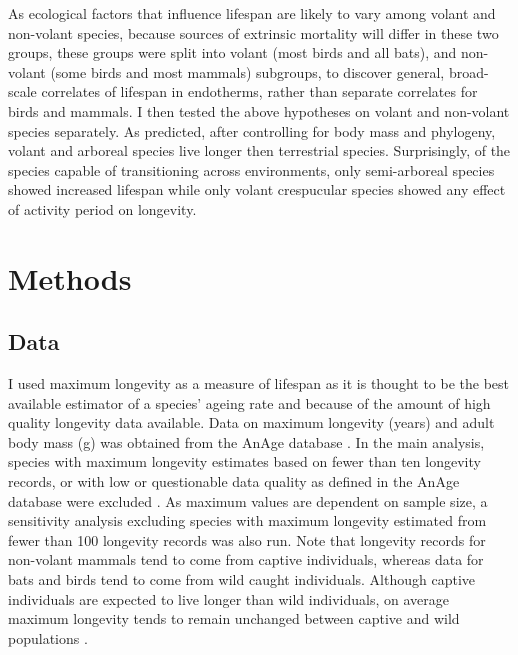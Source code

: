 As ecological factors that influence lifespan are likely to vary among volant and non-volant species, because sources of extrinsic mortality will differ in these two groups, these groups were split into volant (most birds and all bats), and non-volant (some birds and most mammals) subgroups, to discover general, broad-scale correlates of lifespan in endotherms, rather than separate correlates for birds and mammals. I then tested the above hypotheses on volant and non-volant species separately. As predicted, after controlling for body mass and phylogeny, volant and arboreal species live longer then terrestrial species. Surprisingly, of the species capable of transitioning across environments, only semi-arboreal species showed increased lifespan while only volant crespucular species showed any effect of activity period on longevity.

\section{Methods}
\subsection{Data}

I used maximum longevity as a measure of lifespan as it is thought to be the best available estimator of a species' ageing rate \citep{de2007analysis} and because of the amount of high quality longevity data available. Data on maximum longevity (years) and adult body mass (g) was obtained from the AnAge database \citep{de2009database,tacutu2012human}. In the main analysis, species with maximum longevity estimates based on fewer than ten longevity records, or with low or questionable data quality as defined in the AnAge database were excluded \citep{de2007analysis}. As maximum values are dependent on sample size, a sensitivity analysis excluding species with maximum longevity estimated from fewer than 100 longevity records was also run. Note that longevity records for non-volant mammals tend to come from captive individuals, whereas data for bats and birds tend to come from wild caught individuals. Although captive individuals are expected to live longer than wild individuals, on average maximum longevity tends to remain unchanged between captive and wild populations \citep{ricklefs2001comparison}.

